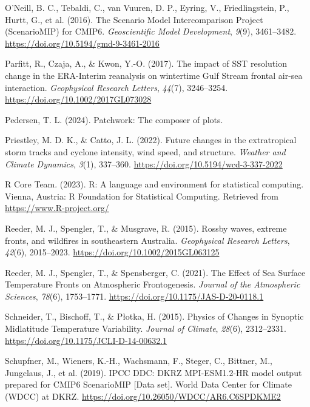 \documentclass[
]{agujournal2019}
\newlength{\cslhangindent}
\newenvironment{CSLReferences}[2] %
 {\begin{list}{}{%
  \setlength{\itemindent}{0pt}
  \setlength{\leftmargin}{0pt}
  \setlength{\parsep}{0pt}
  \ifodd #1
   \setlength{\leftmargin}{\cslhangindent}
   \setlength{\itemindent}{-1\cslhangindent}
  \fi
  \setlength{\itemsep}{#2\baselineskip}}}
 {\end{list}}
\begin{document}
\begin{CSLReferences}{1}{0}
O'Neill, B. C., Tebaldi, C., van Vuuren, D. P., Eyring, V.,
Friedlingstein, P., Hurtt, G., et al. (2016). The {Scenario Model
Intercomparison Project} ({ScenarioMIP}) for {CMIP6}.
\emph{Geoscientific Model Development}, \emph{9}(9), 3461--3482.
\url{https://doi.org/10.5194/gmd-9-3461-2016}

Parfitt, R., Czaja, A., \& Kwon, Y.-O. (2017). The impact of {SST}
resolution change in the {ERA-Interim} reanalysis on wintertime {Gulf
Stream} frontal air-sea interaction. \emph{Geophysical Research
Letters}, \emph{44}(7), 3246--3254.
\url{https://doi.org/10.1002/2017GL073028}

Pedersen, T. L. (2024). Patchwork: The composer of plots.

Priestley, M. D. K., \& Catto, J. L. (2022). Future changes in the
extratropical storm tracks and cyclone intensity, wind speed, and
structure. \emph{Weather and Climate Dynamics}, \emph{3}(1), 337--360.
\url{https://doi.org/10.5194/wcd-3-337-2022}

R Core Team. (2023). R: A language and environment for statistical
computing. Vienna, Austria: R Foundation for Statistical Computing.
Retrieved from \url{https://www.R-project.org/}

Reeder, M. J., Spengler, T., \& Musgrave, R. (2015). Rossby waves,
extreme fronts, and wildfires in southeastern {Australia}.
\emph{Geophysical Research Letters}, \emph{42}(6), 2015--2023.
\url{https://doi.org/10.1002/2015GL063125}

Reeder, M. J., Spengler, T., \& Spensberger, C. (2021). The {Effect} of
{Sea Surface Temperature Fronts} on {Atmospheric Frontogenesis}.
\emph{Journal of the Atmospheric Sciences}, \emph{78}(6), 1753--1771.
\url{https://doi.org/10.1175/JAS-D-20-0118.1}

Schneider, T., Bischoff, T., \& Płotka, H. (2015). Physics of {Changes}
in {Synoptic Midlatitude Temperature Variability}. \emph{Journal of
Climate}, \emph{28}(6), 2312--2331.
\url{https://doi.org/10.1175/JCLI-D-14-00632.1}

Schupfner, M., Wieners, K.-H., Wachsmann, F., Steger, C., Bittner, M.,
Jungclaus, J., et al. (2019). {IPCC DDC}: {DKRZ MPI-ESM1}.2-{HR} model
output prepared for {CMIP6 ScenarioMIP} {[}Data set{]}. World Data
Center for Climate (WDCC) at DKRZ.
\url{https://doi.org/10.26050/WDCC/AR6.C6SPDKME2}


\end{CSLReferences}
\end{document}
